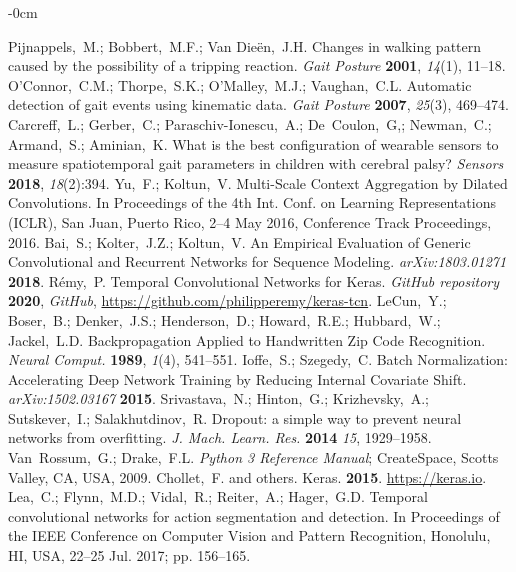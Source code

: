 \documentclass[sensors,article,submit,pdftex,moreauthors]{Definitions/mdpi}
\begin{document}
\begin{adjustwidth}{-\extralength}{0cm}
\begin{thebibliography}{999}
	Pijnappels,~M.; Bobbert,~M.F.; Van Die\"{e}n,~J.H. Changes in walking pattern caused by the possibility of a tripping reaction. {\em Gait Posture} {\bf 2001}, {\em 14}(1), 11--18.
	O'Connor,~C.M.; Thorpe,~S.K.; O'Malley,~M.J.; Vaughan,~C.L. Automatic detection of gait events using kinematic data. {\em Gait Posture} {\bf 2007}, {\em 25}(3), 469--474.
	Carcreff,~L.; Gerber,~C.; Paraschiv-Ionescu,~A.; De~Coulon,~G,; Newman,~C.; Armand,~S.; Aminian,~K. What is the best configuration of wearable sensors
	to measure spatiotemporal gait parameters in children with cerebral palsy? {\em Sensors} {\bf 2018}, {\em 18}(2):394.
	Yu,~F.; Koltun,~V. Multi-Scale Context Aggregation by Dilated Convolutions. In Proceedings of the 4th Int. Conf. on Learning Representations (ICLR), San Juan, Puerto Rico, 2--4 May 2016, Conference Track Proceedings, 2016.
	Bai,~S.; Kolter,~J.Z.; Koltun,~V. An Empirical Evaluation of Generic Convolutional and Recurrent Networks for Sequence Modeling. {\em arXiv:1803.01271} {\bf 2018}.
	R\'{e}my,~P. Temporal Convolutional Networks for Keras. {\em GitHub repository} {\bf 2020}, {\em GitHub}, \url{https://github.com/philipperemy/keras-tcn}.
	LeCun,~Y.; Boser,~B.; Denker,~J.S.; Henderson,~D.; Howard,~R.E.; Hubbard,~W.; Jackel,~L.D. Backpropagation Applied to Handwritten Zip Code Recognition. {\em Neural Comput.} {\bf 1989}, {\em 1}(4), 541--551.
	Ioffe,~S.; Szegedy,~C. Batch Normalization: Accelerating Deep Network Training by
	Reducing Internal Covariate Shift. {\em arXiv:1502.03167} {\bf 2015}.
	Srivastava,~N.; Hinton,~G.; Krizhevsky,~A.; Sutskever,~I.; Salakhutdinov,~R. Dropout: a
	simple way to prevent neural networks from overfitting. {\em J. Mach. Learn. Res.} {\bf 2014} {\em 15}, 1929--1958.
	Van~Rossum,~G.; Drake,~F.L. \textit{Python 3 Reference Manual}; CreateSpace, Scotts Valley, CA, USA, 2009.
	Chollet,~F. and others. Keras. {\bf 2015}. \url{https://keras.io}.
	Lea,~C.; Flynn,~M.D.; Vidal,~R.; Reiter,~A.; Hager,~G.D. Temporal convolutional networks for action segmentation and detection. In Proceedings of the IEEE Conference on Computer Vision and Pattern Recognition, Honolulu, HI, USA, 22--25 Jul. 2017; pp. 156--165.

\end{thebibliography}
\end{adjustwidth}
\end{document}
